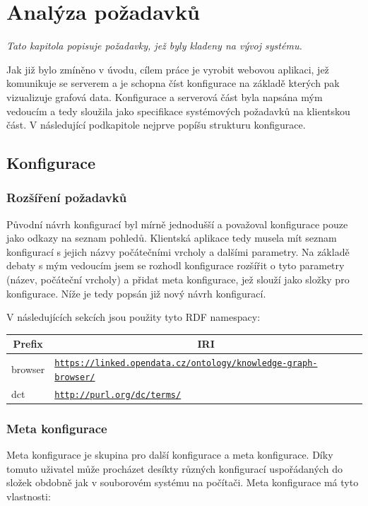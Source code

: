\chapter{Analýza požadavků}

\textit{Tato kapitola popisuje požadavky, jež byly kladeny na vývoj systému.}

Jak již bylo zmíněno v úvodu, cílem práce je vyrobit webovou aplikaci, jež komunikuje se serverem a je schopna číst konfigurace na základě kterých pak vizualizuje grafová data. Konfigurace a serverová část byla napsána mým vedoucím a tedy sloužila jako specifikace systémových požadavků na klientskou část. V následující podkapitole nejprve popíšu strukturu konfigurace.

\section{Konfigurace}

\subsection{Rozšíření požadavků}
Původní návrh konfigurací byl mírně jednodušší a považoval konfigurace pouze jako odkazy na seznam pohledů. Klientská aplikace tedy musela mít seznam konfigurací s jejich názvy počátečními vrcholy a dalšími parametry. Na základě debaty s mým vedoucím jsem se rozhodl konfigurace rozšířit o tyto parametry (název, počáteční vrcholy) a přidat meta konfigurace, jež slouží jako složky pro konfigurace. Níže je tedy popsán již nový návrh konfigurací.

\bigskip

V následujících sekcích jsou použity tyto RDF namespacy:
\begin{table}[h] \centering
\begin{tabular}{lp{10cm}}
\toprule
\multicolumn{1}{c}{Prefix} & \multicolumn{1}{c}{IRI}                                      \\
\midrule
browser                    & \texttt{\url{https://linked.opendata.cz/ontology/knowledge-graph-browser/}} \\
dct                        & \texttt{\url{http://purl.org/dc/terms/}}
\end{tabular}
\end{table}

\subsection{Meta konfigurace} \label{pozadavky-metakonfigurace}
Meta konfigurace je skupina pro další konfigurace a meta konfigurace. Díky tomuto uživatel může procházet desíkty různých konfigurací uspořádaných do složek obdobně jak v souborovém systému na počítači. Meta konfigurace má tyto vlastnosti:

